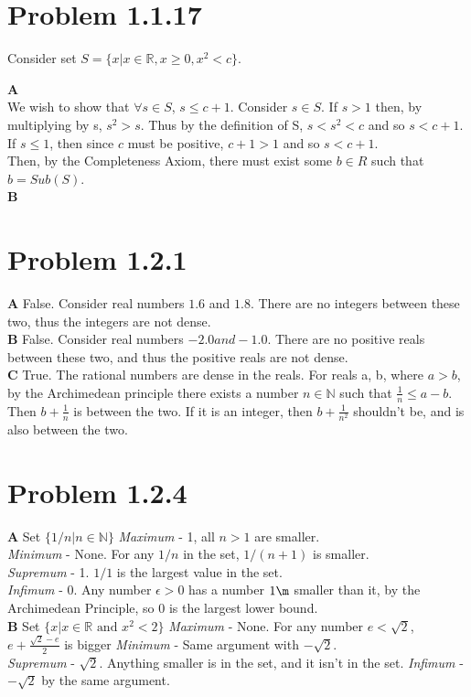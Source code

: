 \documentclass[10pt]{article} %
\begin{document}
\section{Problem 1.1.17}
Consider set $S = \{x | x \in \mathbb{R}, x \geq 0, x^2 < c\}$.

\textbf{A}\\
We wish to show that $\forall s \in S$, $s \leq c + 1$. Consider $s \in S$. If $s > 1$ then, by multiplying by s, $s^2 > s$. Thus by the definition of S, $s < s^2 < c$ and so $s < c+1$. If $s \leq 1$, then since $c$ must be positive, $c + 1 > 1$ and so $s < c + 1$.\\

Then, by the Completeness Axiom, there must exist some $b \in R$ such that $b = Sub(S)$.\\

\textbf{B}\\

\section{Problem 1.2.1}
\textbf{A} False. Consider real numbers $1.6$ and $1.8$. There are no integers between these two, thus the integers are not dense.\\
\textbf{B} False. Consider real numbers $-2.0 and -1.0$. There are no positive reals between these two, and thus the positive reals are not dense.\\
\textbf{C} True. The rational numbers are dense in the reals. For reals a, b, where $a > b$, by the Archimedean principle there exists a number $n \in \mathbb{N}$ such that $\frac{1}{n} \leq a-b$. Then $b + \frac{1}{n}$ is between the two. If it is an integer, then $b + \frac{1}{n^2}$ shouldn't be, and is also between the two.


\section{Problem 1.2.4}
\textbf{A} Set $\{1/n | n \in \mathbb{N}\}$
\textit{Maximum} - 1, all $n > 1$ are smaller.\\
\textit{Minimum} - None. For any $1/n$ in the set, $1/(n+1)$ is smaller.\\
\textit{Supremum} - 1. $1/1$ is the largest value in the set.\\
\textit{Infimum} - 0. Any number $\epsilon > 0$ has a number $1\m$ smaller than it, by the Archimedean Principle, so 0 is the largest lower bound.\\

\textbf{B} Set $\{x | x \in \mathbb{R} \mbox{ and } x^2 < 2\}$
\textit{Maximum} - None. For any number $e < \sqrt{2}$, $e + \frac{\sqrt{2}-e}{2}$ is bigger
\textit{Minimum} - Same argument with $-\sqrt{2}$.\\
\textit{Supremum} - $\sqrt{2}$. Anything smaller is in the set, and it isn't in the set.
\textit{Infimum} - $-\sqrt{2}$ by the same argument.\\
\end{document}
